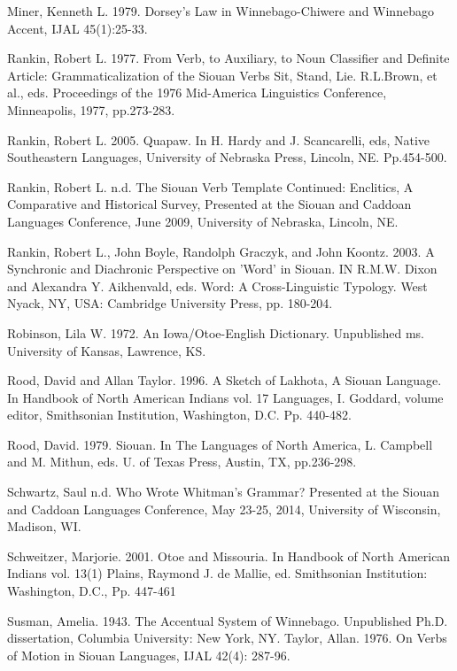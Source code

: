 \documentclass[output=paper]{LSP/langsci}
\begin{document}
\begin{reflist}
Miner, Kenneth L. 1979. Dorsey's Law in Winnebago-Chiwere and Winnebago Accent, IJAL 45(1):25-33.   	
	            	 					
Rankin, Robert L.  1977.  From Verb, to Auxiliary, to Noun Classifier and Definite Article: Grammaticalization of the Siouan Verbs Sit, Stand, Lie. R.L.Brown, et al., eds. Proceedings of the 1976 Mid-America Linguistics Conference, Minneapolis, 1977, pp.273-283.    
  
Rankin, Robert L.  2005.  Quapaw. In H. Hardy and J. Scancarelli, eds, Native Southeastern Languages, University of Nebraska Press, Lincoln, NE.  Pp.454-500.		         	
             
Rankin, Robert L.  n.d.  The Siouan Verb Template Continued: Enclitics, A Comparative and Historical Survey, Presented at the Siouan and Caddoan Languages Conference, June 2009, 	University of Nebraska, Lincoln, NE. 
  
Rankin, Robert L., John Boyle, Randolph Graczyk, and John Koontz. 2003.  A Synchronic and Diachronic Perspective on 'Word' in Siouan.  IN R.M.W. Dixon and Alexandra Y. Aikhenvald, eds. Word:  A Cross-Linguistic Typology. West Nyack, NY, USA:  Cambridge University Press, pp. 180-204.							     					     			          
 
Robinson, Lila W. 1972.  An Iowa/Otoe-English Dictionary. Unpublished ms. University of Kansas, Lawrence, KS.  
 
Rood, David and Allan Taylor. 1996.  A Sketch of Lakhota, A Siouan Language. In Handbook of North American Indians vol. 17 Languages, I. Goddard, volume editor, Smithsonian Institution, Washington, D.C.  Pp. 440-482.  	

Rood, David.  1979.  Siouan. In The Languages of North America, L. Campbell and M. Mithun, eds.  U. of Texas Press, Austin, TX, pp.236-298.  
			          		           			           
Schwartz, Saul  n.d. Who Wrote Whitman's Grammar?  Presented at the Siouan and Caddoan Languages Conference, May 23-25, 2014, University of Wisconsin, Madison, WI.	  
 
Schweitzer, Marjorie. 2001. Otoe and Missouria. In Handbook of North American Indians vol. 13(1) Plains,  Raymond J. de Mallie, ed.  Smithsonian Institution:  Washington, D.C., Pp. 447-461           
 
 Susman, Amelia. 1943. The Accentual System of Winnebago. Unpublished Ph.D. dissertation, Columbia University: New York, NY.  								              
Taylor, Allan. 1976.  On Verbs of Motion in Siouan Languages, IJAL 42(4): 287-96. 	            
 

\end{reflist}
\end{document}
